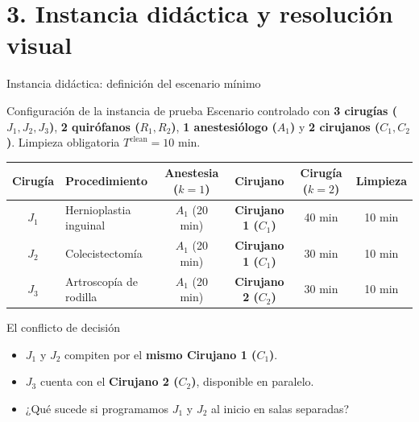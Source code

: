 \documentclass[aspectratio=169,11pt]{beamer}
\begin{document}
\section{3. Instancia didáctica y resolución visual}

\begin{frame}{Instancia didáctica: definición del escenario mínimo}
  \begin{block}{Configuración de la instancia de prueba}
    Escenario controlado con \textbf{3 cirugías ($J_1, J_2, J_3$)}, \textbf{2 quirófanos ($R_1, R_2$)}, \textbf{1 anestesiólogo ($A_1$)} y \textbf{2 cirujanos ($C_1, C_2$)}. Limpieza obligatoria $T^{\text{clean}} = 10\text{ min}$.
  \end{block}

  \begin{table}
    \centering
    \footnotesize
    \setlength{\tabcolsep}{6pt}
    \begin{tabular}{clcccc}
      \toprule
      \textbf{Cirugía} & \textbf{Procedimiento} & \textbf{Anestesia ($k=1$)} & \textbf{Cirujano} & \textbf{Cirugía ($k=2$)} & \textbf{Limpieza} \\
      \midrule
      $J_1$ & Hernioplastia inguinal & $A_1$ (20 min) & \textcolor{primary}{\textbf{Cirujano 1 ($C_1$)}} & 40 min & 10 min \\
      $J_2$ & Colecistectomía & $A_1$ (20 min) & \textcolor{primary}{\textbf{Cirujano 1 ($C_1$)}} & 30 min & 10 min \\
      $J_3$ & Artroscopía de rodilla & $A_1$ (20 min) & \textcolor{best}{\textbf{Cirujano 2 ($C_2$)}} & 30 min & 10 min \\
      \bottomrule
    \end{tabular}
  \end{table}

  \begin{alertblock}{El conflicto de decisión}
    \begin{itemize}
      \item $J_1$ y $J_2$ compiten por el \textbf{mismo Cirujano 1 ($C_1$)}.
      \item $J_3$ cuenta con el \textbf{Cirujano 2 ($C_2$)}, disponible en paralelo.
      \item ¿Qué sucede si programamos $J_1$ y $J_2$ al inicio en salas separadas?
    \end{itemize}
  \end{alertblock}
\end{frame}
\end{document}
